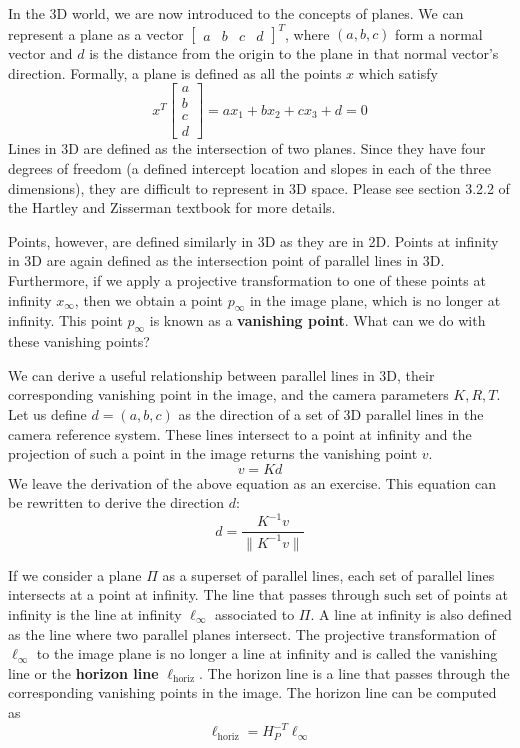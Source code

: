 \documentclass[a4paper, 12pt]{article}
\renewcommand\emph{\textbf}
\begin{document}
In the 3D world, we are now introduced to the concepts of planes. We can represent a plane as a vector $\begin{bmatrix}a&b&c&d\end{bmatrix} ^T$, where $(a,b,c)$ form a normal vector and $d$ is the distance from the origin to the plane in that normal vector's direction. Formally, a plane is defined as all the points $x$ which satisfy
\begin{equation}
x^T\begin{bmatrix}a\\b\\c\\d\end{bmatrix} = ax_1 + bx_2 + cx_3 + d = 0
\end{equation}
Lines in 3D are defined as the intersection of two planes. Since they have four degrees of freedom (a defined intercept location and slopes in each of the three dimensions), they are difficult to represent in 3D space. Please see section 3.2.2 of the Hartley and Zisserman textbook for more details.

Points, however, are defined similarly in 3D as they are in 2D. Points at infinity in 3D are again defined as the intersection point of parallel lines in 3D. Furthermore, if we apply a projective transformation to one of these points at infinity $x_\infty$, then we obtain a point $p_\infty$ in the image plane, which is no longer at infinity. This point $p_\infty$ is known as a \emph{vanishing point}. What can we do with these vanishing points?

We can derive a useful relationship between parallel lines in 3D, their corresponding vanishing point in the image, and the camera parameters $K,R,T$. Let us define $d = (a,b,c)$ as the direction of a set of 3D parallel lines in the camera reference system. These lines intersect to a point at infinity and the projection of such a point in the image returns the vanishing point $v$.
\begin{equation}
v = Kd
\end{equation}
We leave the derivation of the above equation as an exercise. This equation can be rewritten to derive the direction $d$: 
\begin{equation}
d = \frac{K^{-1}v}{\|K^{-1}v\|}
\end{equation}

If we consider a plane $\Pi$ as a superset of parallel lines, each set of parallel lines intersects at a point at infinity. The line that passes through such set of points at infinity is the line at infinity $\ell_\infty$ associated to $\Pi$. A line at infinity is also defined as the line where two parallel planes intersect. The projective transformation of $\ell_\infty$ to the image plane is no longer a line at infinity and is called the vanishing line or the \emph{horizon line} $\ell_{\mathrm{horiz}}$. The horizon line is a line that passes through the corresponding vanishing points in the image. The horizon line can be computed as 
\begin{equation}
\ell_{\mathrm{horiz}} = H_P^{-T} \ell_\infty
\end{equation}
\end{document}
